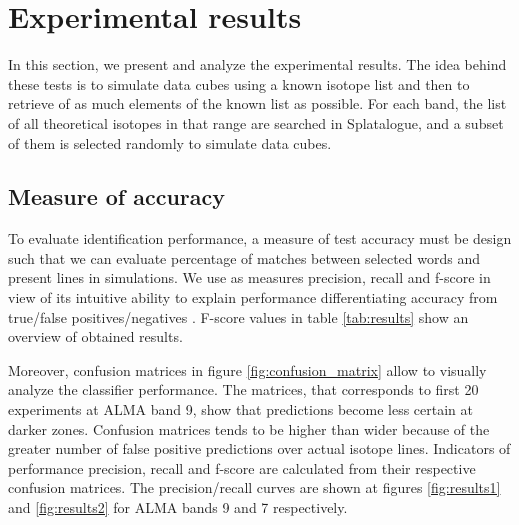 \section{Experimental results} \label{sec:results}

In this section, we present and analyze the experimental results.
The idea behind these tests is to simulate data cubes using a known isotope list and then to retrieve of as much elements of the known list as possible.
For each band, the list of all theoretical isotopes in that range are searched in Splatalogue, and a subset of them is selected randomly to simulate data cubes.

\subsection{Measure of accuracy}
To evaluate identification performance, a measure of test accuracy must be design such that we can evaluate percentage of matches between selected words and present lines in simulations.
We use as measures precision, recall and f-score in view of its intuitive ability to explain performance differentiating accuracy from true/false positives/negatives \citep{precision_recall}.
F-score values in table \ref{tab:results} show an overview of obtained results.

Moreover, confusion matrices in figure \ref{fig:confusion_matrix} allow to visually analyze the classifier performance.
The matrices, that corresponds to first 20 experiments at ALMA band 9, show that predictions become less certain at darker zones.
Confusion matrices tends to be higher than wider because of the greater number of false positive predictions over actual isotope lines.
Indicators of performance precision, recall and f-score are calculated from their respective confusion matrices.
The precision/recall curves are shown at figures \ref{fig:results1} and \ref{fig:results2} for ALMA bands 9 and 7 respectively.

